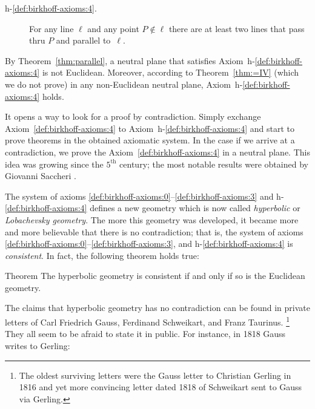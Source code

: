 \begin{framed}
\begin{description}
\item[{\rm h-$\!$\ref{def:birkhoff-axioms:4}.}]\label{def:hyperbolic-4a}  
For any line $\ell$ and any point $P\notin\ell$ 
there are at least two lines that pass thru $P$ and parallel to~$\ell$.
\end{description}
\end{framed}

By Theorem~\ref{thm:parallel}, a neutral plane that satisfies Axiom~h-$\!$\ref{def:birkhoff-axioms:4} is not Euclidean. 
Moreover, according to Theorem~\ref{thm:=IV} (which we do not prove) 
in any non-Euclidean neutral plane, Axiom~h-$\!$\ref{def:birkhoff-axioms:4} holds.

It opens a way to look for a proof by contradiction.
Simply exchange  Axiom~\ref{def:birkhoff-axioms:4} to Axiom~h-$\!$\ref{def:birkhoff-axioms:4}
 and start to prove theorems in the obtained axiomatic system.
In the case if we arrive at a contradiction, 
we prove the Axiom~\ref{def:birkhoff-axioms:4} in a neutral plane.
This idea was growing since the $5^\text{th}$ century;
the most notable results were obtained by Giovanni Saccheri \cite{saccheri}.

The system of axioms \ref{def:birkhoff-axioms:0}--\ref{def:birkhoff-axioms:3} and h-$\!$\ref{def:birkhoff-axioms:4} defines a new geometry which is now called \emph{hyperbolic} or \emph{Lobachevsky  geometry}.
The more this geometry was developed,
it became more and more believable that there is no contradiction;
that is, the system of axioms \ref{def:birkhoff-axioms:0}--\ref{def:birkhoff-axioms:3}, and h-$\!$\ref{def:birkhoff-axioms:4} is \emph{consistent}.
In fact, the following theorem holds true:


\begin{thm}{Theorem}\label{thm:consistent}
The hyperbolic geometry is consistent if and only if so is the Euclidean geometry.
\end{thm}

The claims
that hyperbolic geometry has no contradiction can be found in private letters of
Carl Friedrich Gauss, 
Ferdinand  Schweikart, 
and Franz Taurinus.%
\footnote{The oldest surviving letters were the Gauss letter to Christian Gerling in 1816 
and yet more convincing letter dated 1818 
of Schweikart sent to Gauss via Gerling.}
They all seem to be afraid to state it in public.
For instance, in 1818 Gauss writes to Gerling:

